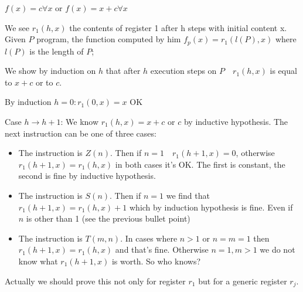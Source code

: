 $f(x) = c  \forall x $ or $ f(x) = x + c \forall x $

We see $ r_1(h,x) $ the contents of register 1 after h steps with initial content x. Given $P$ program, the function computed by him $ f_p(x) = r_1(l(P), x) $ where $ l(P) $ is the length of $P$;

We show by induction on $h$ that after $h$ execution steps on $P \quad  r_1(h,x) $ is equal to $x + c$ or to $c$.

By induction $h = 0: r_1(0,x) = x $ OK

Case $ h \rightarrow h+1 $: We know $ r_1(h,x) = x+c $ or $ c $ by inductive hypothesis. The next instruction can be one of three cases:
\begin{itemize}
\item The instruction is $Z (n)$. Then if $n = 1  \quad  r_1(h+1,x) = 0 $, otherwise $ r_1(h+1,x) = r_1(h,x) $ in both cases it's OK. The first is constant, the second is fine by inductive hypothesis.
\item The instruction is $S (n)$. Then if $n = 1$ we find that $ r_1(h+1,x) = r_1(h,x)+1 $ which by induction hypothesis is fine. Even if $n$ is other than 1 (see the previous bullet point)
\item The instruction is $T (m, n)$. In cases where $ n>1 $ or $ n=m=1 $ then $ r_1(h+1,x) = r_1(h,x) $ and that's fine. Otherwise $ n = 1, m > 1 $ we do not know what $ r_1(h+1,x) $ is worth. So who knows?
\end{itemize}

Actually we should prove this not only for register $ r_1 $ but for a generic
register $ r_j $.
